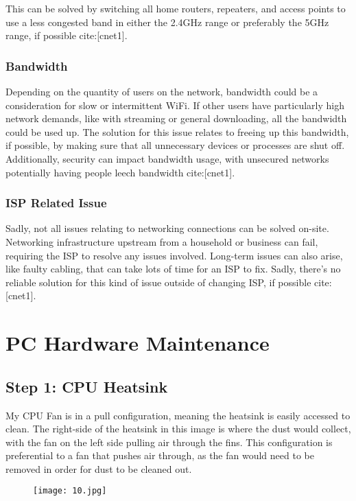 \documentclass[11pt]{amsart}
\begin{document}
This can be solved by switching all home routers, repeaters, and access points to use a less congested band in either the 2.4GHz range or preferably the 5GHz range, if possible cite:[cnet1].


\hypertarget{x-bandwidth}{\subsubsection*{Bandwidth}}
Depending on the quantity of users on the network, bandwidth could be a consideration for slow or intermittent WiFi. If other users have particularly high network demands, like with streaming or general downloading, all the bandwidth could be used up. The solution for this issue relates to freeing up this bandwidth, if possible, by making sure that all unnecessary devices or processes are shut off. Additionally, security can impact bandwidth usage, with unsecured networks potentially having people leech bandwidth cite:[cnet1].


\hypertarget{x-isp-related-issue}{\subsubsection*{ISP Related Issue}}
Sadly, not all issues relating to networking connections can be solved on-site. Networking infrastructure upstream from a household or business can fail, requiring the ISP to resolve any issues involved. Long-term issues can also arise, like faulty cabling, that can take lots of time for an ISP to fix. Sadly, there’s no reliable solution for this kind of issue outside of changing ISP, if possible cite:[cnet1].


\hypertarget{x-pc-hardware-maintenance}{\section*{PC Hardware Maintenance}}
\hypertarget{x-step-1:-cpu-heatsink}{\subsection*{Step 1: CPU Heatsink}}
My CPU Fan is in a pull configuration, meaning the heatsink is easily accessed to clean. The right-side of the heatsink in this image is where the dust would collect, with the fan on the left side pulling air through the fins. This configuration is preferential to a fan that pushes air through, as the fan would need to be removed in order for dust to be cleaned out.


\begin{figure}[h]{}
\centering\texttt{[image: 10.jpg]}
\caption{}

\end{figure}
\end{document}
